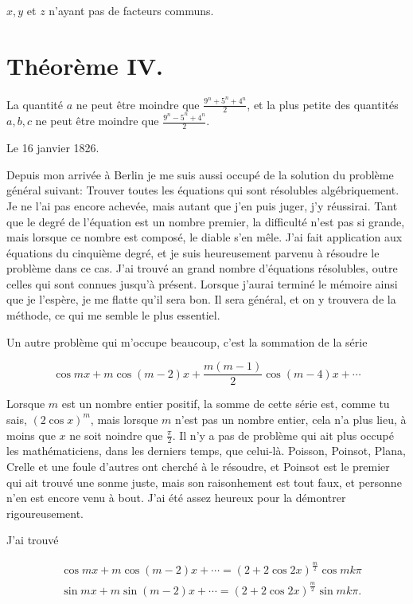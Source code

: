 \documentclass{article}
\begin{document}
\(x, y\) et \(z\) n'ayant pas de facteurs communs.

\section*{Théorème IV.}

La quantité \(a\) ne peut être moindre que \(\frac{9^{n}+5^{n}+4^{n}}{2}\), et la plus petite des quantités \(a, b, c\) ne peut être moindre que \(\frac{9^{n}-5^{n}+4^{n}}{2}\).

Le 16 janvier 1826.

Depuis mon arrivée à Berlin je me suis aussi occupé de la solution du problème général suivant: Trouver toutes les équations qui sont résolubles algébriquement. Je ne l'ai pas encore achevée, mais autant que j'en puis juger, j'y réussirai. Tant que le degré de l'équation est un nombre premier, la difficulté n'est pas si grande, mais lorsque ce nombre est composé, le diable s'en mêle. J'ai fait application aux équations du cinquième degré, et je suis heureusement parvenu à résoudre le problème dans ce cas. J'ai trouvé an grand nombre d'équations résolubles, outre celles qui sont connues jusqu'à présent. Lorsque j'aurai terminé le mémoire ainsi que je l'espère, je me flatte qu'il sera bon. Il sera général, et on y trouvera de la méthode, ce qui me semble le plus essentiel.

Un autre problème qui m'occupe beaucoup, c'est la sommation de la série

\[
\cos m x+m \cos (m-2) x+\frac{m(m-1)}{2} \cos (m-4) x+\cdots
\]

Lorsque \(m\) est un nombre entier positif, la somme de cette série est, comme tu sais, \((2 \cos x)^{m}\), mais lorsque \(m\) n'est pas un nombre entier, cela n'a plus lieu, à moins que \(x\) ne soit noindre que \(\frac{\pi}{2}\). Il n'y a pas de problème qui ait plus occupé les mathématiciens, dans les derniers temps, que celui-là. Poisson, Poinsot, Plana, Crelle et une foule d'autres ont cherché à le résoudre, et Poinsot est le premier qui ait trouvé une sonme juste, mais son raisonhement est tout faux, et personne n'en est encore venu à bout. J'ai été assez heureux pour la démontrer rigoureusement.

J'ai trouvé

\[
\begin{aligned}
& \cos m x+m \cos (m-2) x+\cdots=(2+2 \cos 2 x)^{\frac{m}{2}} \cos m k \pi \\
& \sin m x+m \sin (m-2) x+\cdots=(2+2 \cos 2 x)^{\frac{m}{2}} \sin m k \pi .
\end{aligned}
\]
\end{document}
